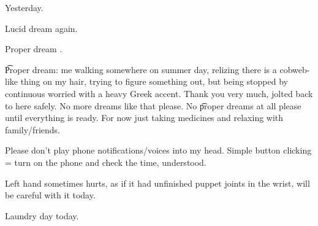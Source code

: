 \startperec
  \item Yesterday.
  \item Lucid dream again.
  \item Proper dream .
  \stopperec

\t{Proper dream}: me walking somewhere on summer day, relizing there is a cobweb-like thing on my hair, trying to figure something out, but being stopped by continuous worried  with a heavy Greek  accent. Thank you very much, jolted back to here  safely. No more dreams like that please. No \t{proper dreams} at all please until everything is ready. For now just taking medicines and relaxing with family/friends.

Please don't play phone notifications/voices into my head. Simple button clicking = turn on the phone and check the time, understood.

Left hand sometimes hurts, as if it had unfinished puppet joints in the wrist, will be careful with it today.

Laundry day today.
